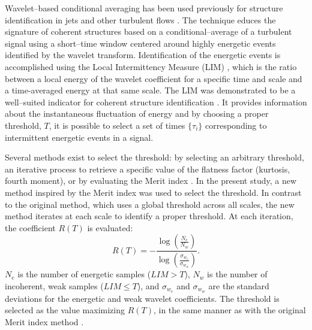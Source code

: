 Wavelet--based conditional averaging has been used previously for structure identification in jets and other turbulent flows \citep{Camussi1997,Camussi1999,Guj1999,Camussi2002,Guj2003}.
The technique educes the signature of coherent structures based on a conditional--average of a turbulent signal using a short--time window centered around highly energetic events identified by the wavelet transform.
Identification of the energetic events is accomplished using the Local Intermittency Measure (LIM) \citep{Farge1992}, which is the ratio between a local energy of the wavelet coefficient for a specific time and scale and a time-averaged energy at that same scale.
The LIM was demonstrated to be a well--suited indicator for coherent structure identification \citep{Camussi1997}.
It provides information about the instantaneous fluctuation of energy and by choosing a proper threshold, $T$, it is possible to select a set of times $\{\tau_{i}\}$ corresponding to intermittent energetic events in a signal.

Several methods exist to select the threshold: by selecting an arbitrary threshold, an iterative process to retrieve a specific value of the flatness factor (kurtosis, fourth moment), or by evaluating the Merit index \citep{Grassucci2015}. 
In the present study, a new method inspired by the Merit index was used to select the threshold. 
In contrast to the original method, which uses a global threshold across all scales, the new method iterates at each scale to identify a proper threshold. 
At each iteration, the coefficient $R(T)$ is evaluated:
\begin{equation} \label{eqn:tEvaluation}
R(T) = -\frac{\log\left(\frac{N_e}{N_w}\right)}{\log\left(\frac{\sigma_{w_e}}{\sigma_{w_w}}\right)}.
\end{equation} 
$N_e$ is the number of energetic samples ($LIM > T$), $N_w$ is the number of incoherent, weak samples ($LIM \leqslant T$), and $\sigma_{w_e}$ and $\sigma_{w_w}$ are the standard deviations for the energetic and weak wavelet coefficients.
The threshold is selected as the value maximizing $R(T)$, in the same manner as with the original Merit index method \citep{Grassucci2015}.

